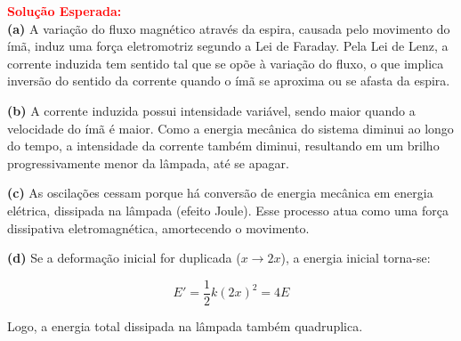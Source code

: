 \documentclass[a4paper,12pt]{article}
\newcommand{\printingbibliography}{%

    \pagestyle{myheadings}
    \markright{}
    \sloppy
    \printbibliography[heading=bibintoc, %
                   title=Refer\^encias %
                  ]
    \fussy%
}
\begin{document}
\vspace{0.5cm}

\textcolor{red}{\textbf{Solu\c{c}\~ao Esperada:}}\\

\textbf{(a)} A varia\c{c}\~ao do fluxo magn\'etico atrav\'es da espira, causada pelo movimento do \'im\~a, induz uma for\c{c}a eletromotriz segundo a Lei de Faraday. Pela Lei de Lenz, a corrente induzida tem sentido tal que se op\~oe \`a varia\c{c}\~ao do fluxo, o que implica invers\~ao do sentido da corrente quando o \'im\~a se aproxima ou se afasta da espira.

\textbf{(b)} A corrente induzida possui intensidade vari\'avel, sendo maior quando a velocidade do \'im\~a \'e maior. Como a energia mec\^anica do sistema diminui ao longo do tempo, a intensidade da corrente tamb\'em diminui, resultando em um brilho progressivamente menor da l\^ampada, at\'e se apagar.

\textbf{(c)} As oscila\c{c}\~oes cessam porque h\'a convers\~ao de energia mec\^anica em energia el\'etrica, dissipada na l\^ampada (efeito Joule). Esse processo atua como uma for\c{c}a dissipativa eletromagn\'etica, amortecendo o movimento.

\textbf{(d)} Se a deforma\c{c}\~ao inicial for duplicada ($x \rightarrow 2x$), a energia inicial torna-se:

\[
E' = \frac{1}{2}k(2x)^2 = 4E
\]

Logo, a energia total dissipada na l\^ampada tamb\'em quadruplica.


\printingbibliography
\end{document}
